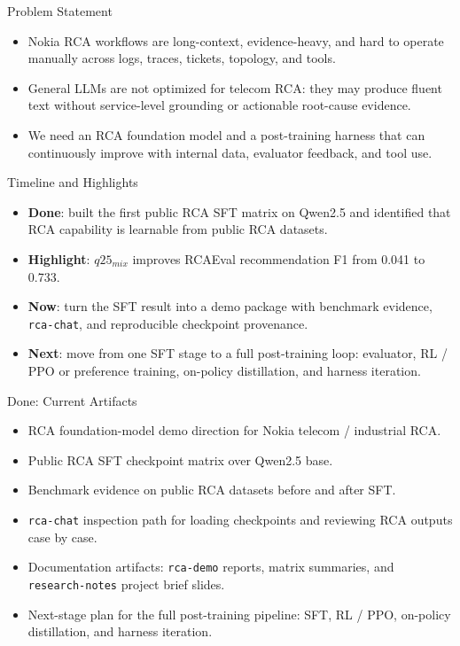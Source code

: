 
\begin{frame}{Problem Statement}
  \begin{itemize}
    \item Nokia RCA workflows are long-context, evidence-heavy, and hard to
      operate manually across logs, traces, tickets, topology, and tools.
    \item General LLMs are not optimized for telecom RCA: they may produce fluent
      text without service-level grounding or actionable root-cause evidence.
    \item We need an RCA foundation model and a post-training harness that can
      continuously improve with internal data, evaluator feedback, and tool use.
  \end{itemize}
\end{frame}

\begin{frame}{Timeline and Highlights}
  \begin{itemize}
    \item \textbf{Done}: built the first public RCA SFT matrix on Qwen2.5 and
      identified that RCA capability is learnable from public RCA datasets.
    \item \textbf{Highlight}: $q25_{mix}$ improves RCAEval recommendation F1
      from 0.041 to 0.733.
    \item \textbf{Now}: turn the SFT result into a demo package with benchmark
      evidence, \texttt{rca-chat}, and reproducible checkpoint provenance.
    \item \textbf{Next}: move from one SFT stage to a full post-training loop:
      evaluator, RL / PPO or preference training, on-policy distillation, and
      harness iteration.
  \end{itemize}
\end{frame}

\begin{frame}{Done: Current Artifacts}
  \begin{itemize}
    \item RCA foundation-model demo direction for Nokia telecom / industrial RCA.
    \item Public RCA SFT checkpoint matrix over Qwen2.5 base.
    \item Benchmark evidence on public RCA datasets before and after SFT.
    \item \texttt{rca-chat} inspection path for loading checkpoints and reviewing
      RCA outputs case by case.
    \item Documentation artifacts: \texttt{rca-demo} reports, matrix summaries,
      and \texttt{research-notes} project brief slides.
    \item Next-stage plan for the full post-training pipeline: SFT, RL / PPO,
      on-policy distillation, and harness iteration.
  \end{itemize}
\end{frame}

